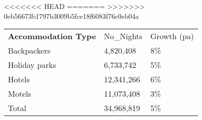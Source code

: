 <<<<<<< HEAD
=======
>>>>>>> 0eb56673b1797b3009b5fce18f6083f76c0eb04a
\begin{tabular}[t]{p{5cm}p{1.3cm}p{1.2cm}}
 \textbf{Accommodation Type} & No\_Nights & Growth (pa) \\ 
 Backpackers &  4,820,408 & 8\% \\ 
  Holiday parks &  6,733,742 & 5\% \\ 
  Hotels & 12,341,266 & 6\% \\ 
  Motels & 11,073,408 & 3\% \\ 
  Total & 34,968,819 & 5\% \\ 
  \end{tabular}
